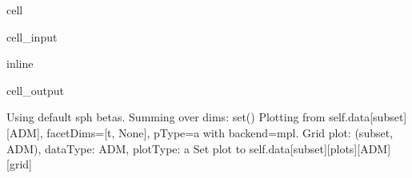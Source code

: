 \documentclass[letterpaper,table,10pt,english]{jupyterBook}
\begin{document}
\begin{sphinxuseclass}{cell}\begin{sphinxVerbatimInput}

\begin{sphinxuseclass}{cell_input}
\begin{sphinxVerbatim}[commandchars=\\\{\}]
 inline  
  
           
\end{sphinxVerbatim}

\end{sphinxuseclass}\end{sphinxVerbatimInput}
\begin{sphinxVerbatimOutput}

\begin{sphinxuseclass}{cell_output}
\begin{sphinxVerbatim}[commandchars=\\\{\}]
Using default sph betas.
Summing over dims: set()
Plotting from self.data[subset][ADM], facetDims=[\PYGZsq{}t\PYGZsq{}, None], pType=a with backend=mpl.
Grid plot: (\PYGZsq{}subset\PYGZsq{}, \PYGZsq{}ADM\PYGZsq{}), dataType: ADM, plotType: a
Set plot to self.data[\PYGZsq{}subset\PYGZsq{}][\PYGZsq{}plots\PYGZsq{}][\PYGZsq{}ADM\PYGZsq{}][\PYGZsq{}grid\PYGZsq{}]
\end{sphinxVerbatim}

\noindent{}

\end{sphinxuseclass}\end{sphinxVerbatimOutput}

\end{sphinxuseclass}
\end{document}
